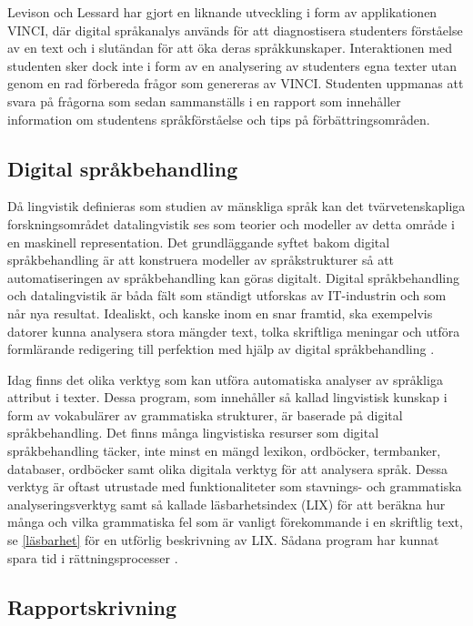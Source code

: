 \documentclass[swedish]{maucsthesis}
\begin{document}
Levison och Lessard \cite{levison:2004} har gjort en liknande utveckling i form av applikationen VINCI, där digital språkanalys används för att diagnostisera studenters förståelse av en text och i slutändan för att öka deras språkkunskaper. Interaktionen med studenten sker dock inte i form av en analysering av studenters egna texter utan genom en rad förbereda frågor som genereras av VINCI. Studenten uppmanas att svara på frågorna som sedan sammanställs i en rapport som innehåller information
om studentens språkförståelse och tips på förbättringsområden.

\subsection{Digital språkbehandling}\label{språkteknologi}

Då lingvistik definieras som studien av mänskliga språk kan det
tvärvetenskapliga forskningsområdet datalingvistik ses som teorier och modeller av detta område i en maskinell representation. Det
grundläggande syftet bakom digital språkbehandling är att konstruera modeller av
språkstrukturer så att automatiseringen av språkbehandling kan göras
digitalt. Digital språkbehandling och datalingvistik är båda fält som ständigt utforskas
av IT-industrin och som når nya resultat. Idealiskt, och kanske inom en snar
framtid, ska exempelvis datorer kunna analysera stora mängder text, tolka
skriftliga meningar och utföra formlärande redigering till perfektion med hjälp
av digital språkbehandling \cite{nugues:2014}.

Idag finns det olika verktyg som kan utföra automatiska analyser av språkliga
attribut i texter. Dessa program, som innehåller så kallad lingvistisk kunskap
i form av vokabulärer av grammatiska strukturer, är baserade på digital språkbehandling. Det finns många lingvistiska
resurser som digital språkbehandling täcker, inte minst en mängd lexikon, ordböcker,
termbanker, databaser, ordböcker samt olika digitala verktyg för att analysera
språk. Dessa verktyg är oftast utrustade med funktionaliteter som stavnings- och
grammatiska analyseringsverktyg samt så kallade läsbarhetsindex (LIX) för att beräkna hur många och vilka grammatiska fel som är vanligt förekommande i en skriftlig text, se \cref{läsbarhet} för en utförlig beskrivning av LIX. Sådana program har kunnat
spara tid i rättningsprocesser \cite{wengelin:2017}.

\subsection{Rapportskrivning}
\end{document}
